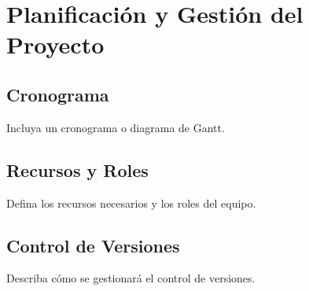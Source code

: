 	\chapter{Planificación y Gestión del Proyecto}
	\section{Cronograma}
	Incluya un cronograma o diagrama de Gantt.
	
	\section{Recursos y Roles}
	Defina los recursos necesarios y los roles del equipo.
	
	\section{Control de Versiones}
	Describa cómo se gestionará el control de versiones.
	
